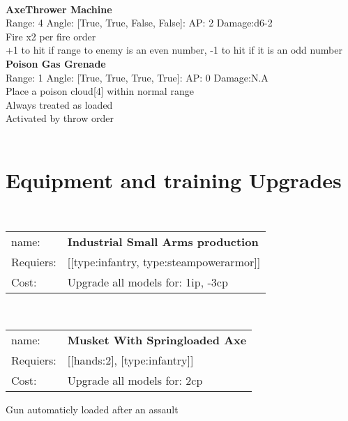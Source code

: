 \ \\
{\bf AxeThrower Machine } \\



Range: 4  Angle: [True, True, False, False]: AP: 2 Damage:d6-2 \\
Fire x2 per fire order\\ 
+1 to hit if range to enemy is an even number, -1 to hit if it is an odd number\\ 




{\bf Poison Gas Grenade } \\



Range: 1  Angle: [True, True, True, True]: AP: 0 Damage:N.A \\
Place a poison cloud[4] within normal range\\ 
Always treated as loaded\\ 
Activated by throw order\\ 




 
\ \\

\section{Equipment and training Upgrades}\ \\
\begin{tabular}{ll}
name: & {\bf Industrial Small Arms production } \\
Requiers: & [[type:infantry, type:steampowerarmor]] \\
Cost: & Upgrade all models for: 1ip, -3cp \\
\end{tabular}










\ \\
\begin{tabular}{ll}
name: & {\bf Musket With Springloaded Axe } \\
Requiers: & [[hands:2], [type:infantry]] \\
Cost: & Upgrade all models for: 2cp \\
\end{tabular}

Gun automaticly loaded after an assault\\ 


